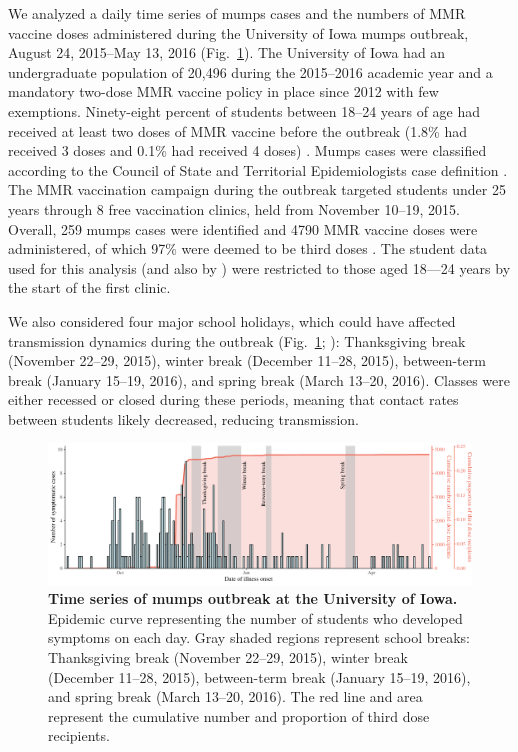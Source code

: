 \documentclass[12pt]{article}
\newcommand{\fref}[1]{Fig.~\ref{fig:#1}}
\begin{document}
We analyzed a daily time series of mumps cases and the numbers of MMR vaccine doses administered during the University of Iowa mumps outbreak, August 24, 2015--May 13, 2016 (\fref{data}).
The University of Iowa had an undergraduate population of 20,496 during the 2015--2016 academic year and a mandatory two-dose MMR vaccine policy in place since 2012 with few exemptions.
Ninety-eight percent of students between 18--24 years of age had received at least two doses of MMR vaccine before the outbreak (1.8\% had received 3 doses and 0.1\% had received 4 doses) \citep{cardemil2017effectiveness}.
Mumps cases were classified according to the Council of State and Territorial Epidemiologists case definition \citep{casedef}. 
The MMR vaccination campaign during the outbreak targeted students under 25 years through 8 free vaccination clinics, held from November 10--19, 2015. 
Overall, 259 mumps cases were identified and 4790 MMR vaccine doses were administered, of which 97\% were deemed to be third doses \citep{cardemil2017effectiveness}.
The student data used for this analysis (and also by \cite{cardemil2017effectiveness}) were restricted to those aged 18---24 years by the start of the first clinic. 

We also considered four major school holidays, which could have affected transmission dynamics during the outbreak (\fref{data}; \cite{iowa}): 
Thanksgiving break (November 22--29, 2015), winter break (December 11--28, 2015), between-term break (January 15--19, 2016), and spring break (March 13--20, 2016).
Classes were either recessed or closed during these periods, meaning that contact rates between students likely decreased, reducing transmission.

\begin{figure}[!th]
\includegraphics[width=\textwidth]{../figure/time_series.pdf}
\caption{
\textbf{Time series of mumps outbreak at the University of Iowa.}
Epidemic curve representing the number of students who developed symptoms on each day.
Gray shaded regions represent school breaks: Thanksgiving break (November 22--29, 2015), winter break (December 11--28, 2015), between-term break (January 15--19, 2016), and spring break (March 13--20, 2016).
The red line and area represent the cumulative number and proportion of third dose recipients.
}
\label{fig:data}
\end{figure}
\end{document}
